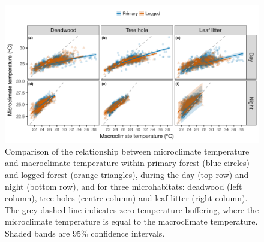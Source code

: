 \documentclass[12pt,a4paper,]{report}
\theoremstyle{definition}
\theoremstyle{definition}
\theoremstyle{definition}
\theoremstyle{remark}
\begin{document}
\begin{figure}[H]

{\centering \includegraphics{./output/fig-B-4-1} 

}

\caption{Comparison of the relationship between microclimate
temperature and macroclimate temperature within primary forest (blue
circles) and logged forest (orange triangles), during the day (top row)
and night (bottom row), and for three microhabitats: deadwood (left
column), tree holes (centre column) and leaf litter (right column). The
grey dashed line indicates zero temperature buffering, where the
microclimate temperature is equal to the macroclimate temperature.
Shaded bands are 95\% confidence intervals.}\label{fig:fig-B-4}
\end{figure}
\end{document}
